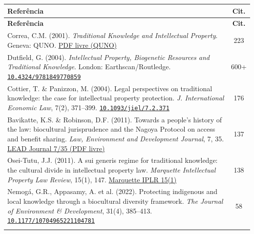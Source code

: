 \documentclass[a4paper,11pt]{article}
\newcommand{\doi}[1]{\href{https://doi.org/#1}{\texttt{#1}}}
\begin{document}
\begin{longtable}{>{\raggedright\arraybackslash}p{} c}
\toprule
\textbf{Referência} & \textbf{Cit.} \\
\midrule
\endfirsthead
\toprule
\textbf{Referência} & \textbf{Cit.} \\
\midrule
\endhead

Correa, C.M. (2001). \textit{Traditional Knowledge and Intellectual Property}. Geneva: QUNO.\newline
\href{https://quakerservice.ca/wp-content/uploads/2011/07/TKcol3.pdf}{PDF livre (QUNO)} & 223 \\
\addlinespace

Dutfield, G. (2004). \textit{Intellectual Property, Biogenetic Resources and Traditional Knowledge}. London: Earthscan/Routledge.\newline
\doi{10.4324/9781849770859} & 600+ \\
\addlinespace

Cottier, T. \& Panizzon, M. (2004). Legal perspectives on traditional knowledge: the case for intellectual property protection. \textit{J. International Economic Law}, 7(2), 371--399.\newline
\doi{10.1093/jiel/7.2.371} & 176 \\
\addlinespace

Bavikatte, K.S. \& Robinson, D.F. (2011). Towards a people's history of the law: biocultural jurisprudence and the Nagoya Protocol on access and benefit sharing. \textit{Law, Environment and Development Journal}, 7, 35.\newline
\href{http://www.lead-journal.org/content/11035.pdf}{LEAD Journal 7/35 (PDF livre)} & 137 \\
\addlinespace

Osei-Tutu, J.J. (2011). A sui generis regime for traditional knowledge: the cultural divide in intellectual property law. \textit{Marquette Intellectual Property Law Review}, 15(1), 147.\newline
\href{https://scholarship.law.marquette.edu/iplr/vol15/iss1/6/}{Marquette IPLR 15(1)} & 138 \\
\addlinespace

Nemogá, G.R., Appasamy, A. et al. (2022). Protecting indigenous and local knowledge through a biocultural diversity framework. \textit{The Journal of Environment \& Development}, 31(4), 385--413.\newline
\doi{10.1177/10704965221104781} & 58 \\
\addlinespace


\end{longtable}
\end{document}
